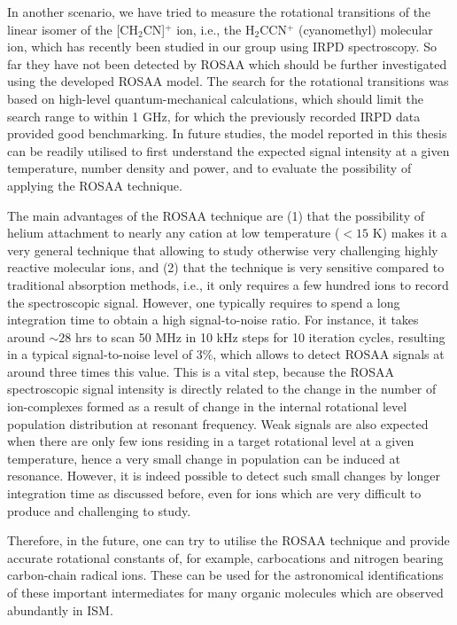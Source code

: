 In another scenario, we have tried to measure the rotational transitions of the linear isomer of the [CH$_2$CN]$^+$ ion, 
i.e., the H$_2$CCN$^+$ (cyanomethyl) molecular ion, which has recently been studied in our group using IRPD 
spectroscopy. So  far they have not been detected by ROSAA which should be further investigated using the developed 
ROSAA model. The search for the rotational transitions was based
on high-level quantum-mechanical calculations, which should limit the search
range to within 1 GHz, for which the previously recorded IRPD data provided good benchmarking. 
In future studies, the model reported in this thesis can be readily utilised to first understand the 
expected signal intensity at a given temperature, number density and power, and to evaluate the possibility of applying 
the ROSAA technique.

The main advantages of the ROSAA technique are (1) that the possibility of helium attachment to nearly any cation at 
low temperature ($< 15$ K) makes it a very general technique that allowing to study otherwise very challenging highly reactive molecular ions, 
and (2) that the technique is very sensitive compared to traditional absorption methods, 
i.e., it only requires a few hundred ions to record the spectroscopic signal.
However, one typically requires to spend a long integration time
to obtain a high signal-to-noise ratio. For instance, it takes around $\sim 28$ hrs to scan 50 MHz in 10 kHz steps for 10 iteration cycles, resulting in a typical signal-to-noise level of $3 \%$, which allows to detect ROSAA signals at around three times this value. This is a vital step, because 
the ROSAA spectroscopic signal intensity is directly related to the change in the number of ion-complexes 
formed as a result of change in the internal rotational level population distribution at resonant frequency.
Weak signals are also expected when there are only few ions 
residing in a target rotational level at a given temperature, hence a very small change 
in population can be induced at resonance. However, it is indeed possible to detect 
such small changes by longer integration time as discussed before, even for ions which are very difficult 
to produce and challenging to study.

Therefore, in the future, one can try to utilise the ROSAA technique and provide accurate rotational constants of, 
for example, carbocations and nitrogen bearing carbon-chain radical ions. These can be used for the astronomical 
identifications of these important intermediates for many organic molecules 
which are observed abundantly in ISM.

